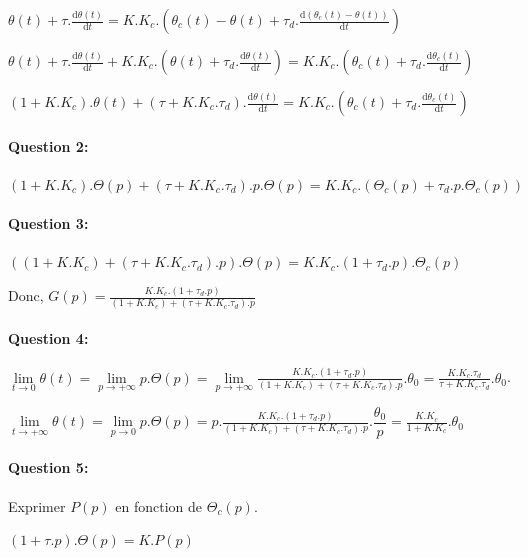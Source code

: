 $\theta(t)+\tau.\frac{\mathrm{d}\theta(t)}{\mathrm{d}t}=K.K_c.\left(\theta_c(t)-\theta(t)+\tau_d.\frac{\mathrm{d}\left(\theta_c(t)-\theta(t)\right)}{\mathrm{d}t}\right)$

$\theta(t)+\tau.\frac{\mathrm{d}\theta(t)}{\mathrm{d}t}+K.K_c.\left(\theta(t)+\tau_d.\frac{\mathrm{d}\theta(t)}{\mathrm{d}t}\right)=K.K_c.\left(\theta_c(t)+\tau_d.\frac{\mathrm{d}\theta_c(t)}{\mathrm{d}t}\right)$

$(1+K.K_c).\theta(t)+(\tau+K.K_c.\tau_d).\frac{\mathrm{d}\theta(t)}{\mathrm{d}t}=K.K_c.\left(\theta_c(t)+\tau_d.\frac{\mathrm{d}\theta_c(t)}{\mathrm{d}t}\right)$

\paragraph{Question 2:} 

$(1+K.K_c).\Theta(p)+(\tau+K.K_c.\tau_d).p.\Theta(p)=K.K_c.\left(\Theta_c(p)+\tau_d.p.\Theta_c(p)\right)$

\paragraph{Question 3:} 

$\left((1+K.K_c)+(\tau+K.K_c.\tau_d).p\right).\Theta(p)=K.K_c.\left(1+\tau_d.p\right).\Theta_c(p)$

Donc, $G(p)=\frac{K.K_c.\left(1+\tau_d.p\right)}{(1+K.K_c)+(\tau+K.K_c.\tau_d).p}$

\paragraph{Question 4:} $\lim\limits_{t\rightarrow 0}\theta(t)=\lim\limits_{p\rightarrow +\infty}p.\Theta(p)=\lim\limits_{p\rightarrow +\infty}\frac{K.K_c.\left(1+\tau_d.p\right)}{(1+K.K_c)+(\tau+K.K_c.\tau_d).p}.\theta_0=\frac{K.K_c.\tau_d}{\tau+K.K_c.\tau_d}.\theta_0$.

$\lim\limits_{t\rightarrow +\infty}\theta(t)=\lim\limits_{p\rightarrow 0}p.\Theta(p)=p.\frac{K.K_c.\left(1+\tau_d.p\right)}{(1+K.K_c)+(\tau+K.K_c.\tau_d).p}.\dfrac{\theta_0}{p}=\frac{K.K_c}{1+K.K_c}.\theta_0$

\paragraph{Question 5:} Exprimer $P(p)$ en fonction de $\Theta_c(p)$.

$\left(1+\tau.p\right).\Theta(p)=K.P(p)$

